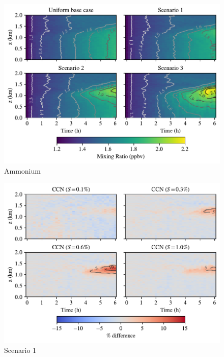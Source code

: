 \newpage
\begin{figure}[h]
  \centering
    \includegraphics[width=\textwidth]{figures/chapter5/height-time-pmc_NH4-four-scenarios.pdf}
    \caption{Ammonium}
    \label{fig:ht-nh4}
\end{figure}


\newpage
\begin{figure}[h]
  \centering
    \includegraphics[width=\textwidth]{figures/chapter5/height-time-ccn-pdiff-fx1fy0.pdf}
    \caption{Scenario 1}
    \label{fig:ht-ccn-pdiff-s1}
\end{figure}

